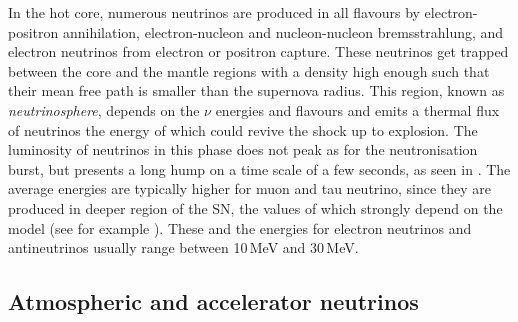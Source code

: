 In the hot core, numerous neutrinos are produced in all flavours by electron-positron annihilation, %
electron-nucleon and nucleon-nucleon bremsstrahlung, and electron neutrinos from electron or positron capture.
These neutrinos get trapped between the core and the mantle regions with a density high enough such that %
their mean free path is smaller than the supernova radius.
This region, known as \emph{neutrinosphere}, depends on the $\nu$ energies and flavours %
and emits a thermal flux of neutrinos the energy of which could revive the shock up to explosion.
The luminosity of neutrinos in this phase does not peak as for the neutronisation burst, %
but presents a long hump on a time scale of a few seconds, as seen in .
The average energies are typically higher for muon and tau neutrino, since they are produced in deeper %
region of the SN, the values of which strongly depend on the model (see for example ).
These and the energies for electron neutrinos and antineutrinos usually range between 10\,MeV and 30\,MeV.


\subsection{Atmospheric and accelerator neutrinos}

